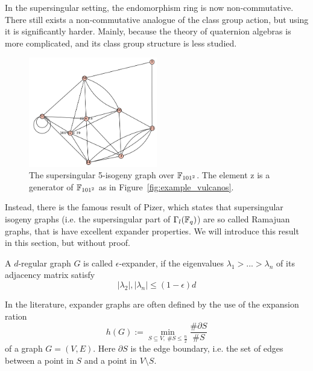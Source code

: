 In the supersingular setting, the endomorphism ring is now non-commutative.
There still exists a non-commutative analogue of the class group action, but using it is significantly harder.
Mainly, because the theory of quaternion algebras is more complicated, and its class group structure is less studied.
\begin{figure}
    \begin{center}
        \includegraphics[width = 0.5\textwidth]{../example_supersingular.png}
    \end{center}
    \caption{
        \label{fig:example_supersingular_graph} The supersingular 5-isogeny graph over $\mathbb{F}_{101^2}$.
        The element $\mathrm{z}$ is a generator of $\mathbb{F}_{101^2}$ as in Figure~\ref{fig:example_vulcanos}.
    }
\end{figure}
Instead, there is the famous result of Pizer, which states that supersingular isogeny graphs (i.e. the supersingular part of $\Gamma_l(\mathbb{F}_q)$) are so called Ramajuan graphs, that is have excellent expander properties.
We will introduce this result in this section, but without proof.
\begin{definition}
    \label{def:expander}
    A $d$-regular graph $G$ is called $\epsilon$-expander, if the eigenvalues $\lambda_1 > ... > \lambda_n$ of its adjacency matrix satisfy
    \begin{equation*}
        |\lambda_2|, |\lambda_n| \leq (1 - \epsilon) d
    \end{equation*}
\end{definition}
In the literature, expander graphs are often defined by the use of the expansion ration
\begin{equation*}
    h(G) := \min_{S \subseteq V, \ \#S \leq \frac n 2} \frac {\#\partial S} {\# S}
\end{equation*}
of a graph $G = (V, E)$.
Here $\partial S$ is the edge boundary, i.e. the set of edges between a point in $S$ and a point in $V \setminus S$.

